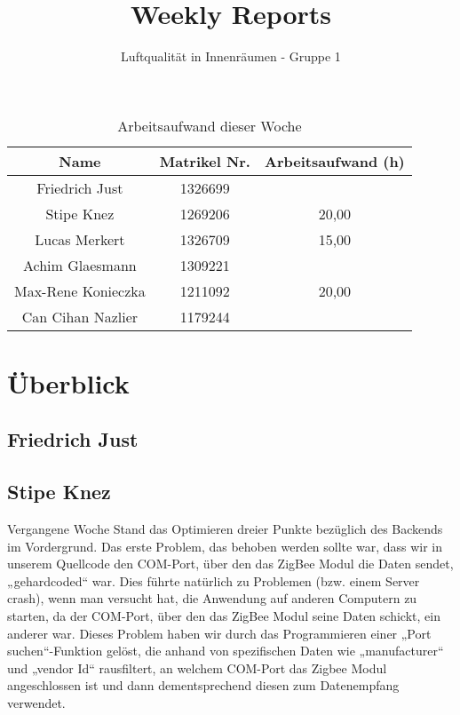 \documentclass[]{article}
\title{Weekly Reports}
\author{Luftqualität in Innenräumen - Gruppe 1}
\begin{document}
\maketitle

\begin{table}[h!]
	\centering
	\begin{tabular}{|c|c|c|}
		\hline
		{\textbf{Name}}				&		{\textbf{Matrikel Nr.}} & {\textbf{Arbeitsaufwand (h)}} \\
		\hline
		Friedrich Just				&		1326699 				&		\\
		\hline
		Stipe Knez					&		1269206 				&	20,00	\\
		\hline
		Lucas Merkert				&		1326709					&	15,00	\\
		\hline
		Achim Glaesmann				&		1309221					&		\\
		\hline
		Max-Rene Konieczka			&		1211092					&	20,00	\\
		\hline
		Can Cihan Nazlier			&		1179244					&		\\
		\hline
	\end{tabular}
	\caption{Arbeitsaufwand dieser Woche}
	\label{tab:worakload}
\end{table}



\section{Überblick}


\subsection{Friedrich Just}




\subsection{Stipe Knez}
Vergangene Woche Stand das Optimieren dreier Punkte bezüglich des Backends im Vordergrund. Das erste Problem, das behoben werden sollte war, dass wir in unserem Quellcode den COM-Port, über den das ZigBee Modul die Daten sendet, „gehardcoded“ war. Dies führte natürlich zu Problemen (bzw. einem Server crash), wenn man versucht hat, die Anwendung auf anderen Computern zu starten, da der COM-Port, über den das ZigBee Modul seine Daten schickt, ein anderer war. Dieses Problem haben wir durch das Programmieren einer „Port suchen“-Funktion gelöst, die anhand von spezifischen Daten wie „manufacturer“ und „vendor Id“ rausfiltert, an welchem COM-Port das Zigbee Modul angeschlossen ist und dann dementsprechend diesen zum Datenempfang verwendet.
\end{document}
